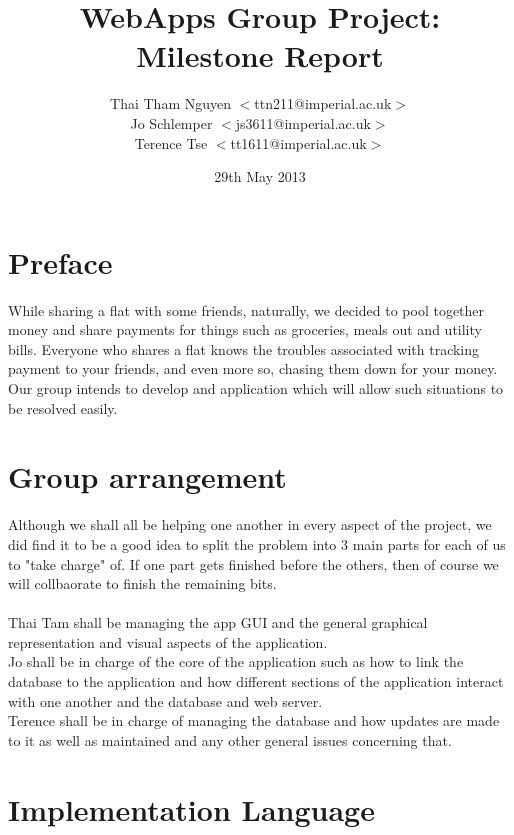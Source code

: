 \documentclass[a4paper,9t]{article}
\begin{document}
\title{WebApps Group Project: Milestone Report} \date{29th May
  2013} \author{
  Thai Tham Nguyen $<$ttn211@imperial.ac.uk$>$\\
  Jo Schlemper $<$js3611@imperial.ac.uk$>$\\
  Terence Tse  $<$tt1611@imperial.ac.uk$>$ }
\maketitle
\section*{Preface}
While sharing a flat with some friends, naturally, we decided to pool together money and share payments for things such as groceries, meals out and utility bills. Everyone who shares a flat knows the troubles associated with tracking payment to your friends, and even more so, chasing them down for your money. Our group intends to develop and application which will allow such situations to be resolved easily.

\section*{Group arrangement}
Although we shall all be helping one another in every aspect of the project, we did find it to be a good idea to split the problem into 3 main parts for each of us to "take charge" of. If one part gets finished before the others, then of course we will collbaorate to finish the remaining bits.\\ \\
Thai Tam shall be managing the app GUI and the general graphical representation and visual aspects of the application.\\
Jo shall be in charge of the core of the application such as how to link the database to the application and how different sections of the application interact with one another and the database and web server.\\
Terence shall be in charge of managing the database and how updates are made to it as well as maintained and any other general issues concerning that.

\section*{Implementation Language}
\end{document}
